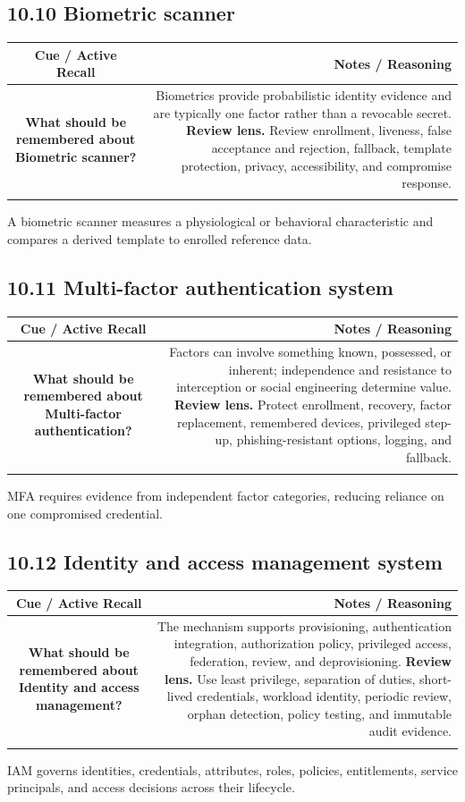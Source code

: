 \documentclass[11pt]{article}
\newcommand{\CornellHeader}{\rowcolor{Navy}\color{white}\bfseries Cue / Active Recall & \color{white}\bfseries Notes / Reasoning \\\endhead}
\newcommand{\CornellRow}[2]{\cellcolor{CueGray}\textbf{#1} & #2 \\\addlinespace[3pt]}
\begin{document}
\subsection{10.10 Biometric scanner}
\begin{longtable}{@{}C N@{}}
\CornellHeader
\CornellRow{What should be remembered about Biometric scanner?}{Biometrics provide probabilistic identity evidence and are typically one factor rather than a revocable secret. \textbf{Review lens.} Review enrollment, liveness, false acceptance and rejection, fallback, template protection, privacy, accessibility, and compromise response.}
\end{longtable}
\begin{sectionsummarybox}
A biometric scanner measures a physiological or behavioral characteristic and compares a derived template to enrolled reference data.
\end{sectionsummarybox}
\subsection{10.11 Multi-factor authentication system}
\begin{longtable}{@{}C N@{}}
\CornellHeader
\CornellRow{What should be remembered about Multi-factor authentication?}{Factors can involve something known, possessed, or inherent; independence and resistance to interception or social engineering determine value. \textbf{Review lens.} Protect enrollment, recovery, factor replacement, remembered devices, privileged step-up, phishing-resistant options, logging, and fallback.}
\end{longtable}
\begin{sectionsummarybox}
MFA requires evidence from independent factor categories, reducing reliance on one compromised credential.
\end{sectionsummarybox}
\subsection{10.12 Identity and access management system}
\begin{longtable}{@{}C N@{}}
\CornellHeader
\CornellRow{What should be remembered about Identity and access management?}{The mechanism supports provisioning, authentication integration, authorization policy, privileged access, federation, review, and deprovisioning. \textbf{Review lens.} Use least privilege, separation of duties, short-lived credentials, workload identity, periodic review, orphan detection, policy testing, and immutable audit evidence.}
\end{longtable}
\begin{sectionsummarybox}
IAM governs identities, credentials, attributes, roles, policies, entitlements, service principals, and access decisions across their lifecycle.
\end{sectionsummarybox}
\end{document}
